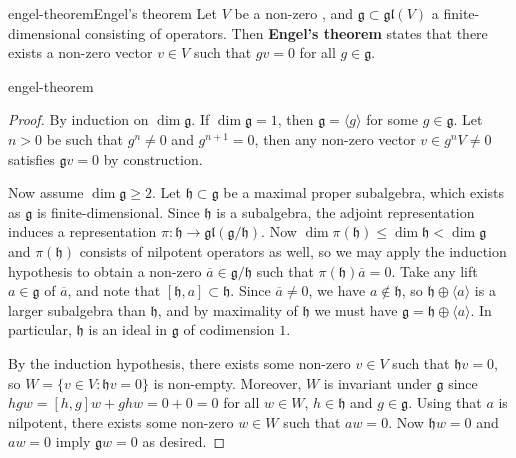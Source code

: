 \begin{topic}{engel-theorem}{Engel's theorem}
    Let $V$ be a non-zero , and $\mathfrak{g} \subset \mathfrak{gl}(V)$ a finite-dimensional  consisting of  operators. Then \textbf{Engel's theorem} states that there exists a non-zero vector $v \in V$ such that $gv = 0$ for all $g \in \mathfrak{g}$.
\end{topic}

\begin{example}{engel-theorem}
    \begin{proof}
        By induction on $\dim \mathfrak{g}$. If $\dim \mathfrak{g} = 1$, then $\mathfrak{g} = \langle g \rangle$ for some $g \in \mathfrak{g}$. Let $n > 0$ be such that $g^n \ne 0$ and $g^{n + 1} = 0$, then any non-zero vector $v \in g^n V \ne 0$ satisfies $\mathfrak{g} v = 0$ by construction.
    
        Now assume $\dim \mathfrak{g} \ge 2$. Let $\mathfrak{h} \subset \mathfrak{g}$ be a maximal proper subalgebra, which exists as $\mathfrak{g}$ is finite-dimensional. Since $\mathfrak{h}$ is a subalgebra, the adjoint representation induces a representation $\pi \colon \mathfrak{h} \to \mathfrak{gl}(\mathfrak{g}/\mathfrak{h})$. Now $\dim \pi(\mathfrak{h}) \le \dim \mathfrak{h} < \dim \mathfrak{g}$ and $\pi(\mathfrak{h})$ consists of nilpotent operators as well, so we may apply the induction hypothesis to obtain a non-zero $\overline{a} \in \mathfrak{g}/\mathfrak{h}$ such that $\pi(\mathfrak{h}) \overline{a} = 0$. Take any lift $a \in \mathfrak{g}$ of $\overline{a}$, and note that $[\mathfrak{h}, a] \subset \mathfrak{h}$. Since $\overline{a} \ne 0$, we have $a \not\in \mathfrak{h}$, so $\mathfrak{h} \oplus \langle a \rangle$ is a larger subalgebra than $\mathfrak{h}$, and by maximality of $\mathfrak{h}$ we must have $\mathfrak{g} = \mathfrak{h} \oplus \langle a \rangle$. In particular, $\mathfrak{h}$ is an ideal in $\mathfrak{g}$ of codimension $1$.
        
        By the induction hypothesis, there exists some non-zero $v \in V$ such that $\mathfrak{h} v = 0$, so $W = \{ v \in V : \mathfrak{h} v = 0 \}$ is non-empty. Moreover, $W$ is invariant under $\mathfrak{g}$ since $hgw = [h, g]w + ghw = 0 + 0 = 0$ for all $w \in W$, $h \in \mathfrak{h}$ and $g \in \mathfrak{g}$. Using that $a$ is nilpotent, there exists some non-zero $w \in W$ such that $aw = 0$. Now $\mathfrak{h} w = 0$ and $aw = 0$ imply $\mathfrak{g} w = 0$ as desired.
    \end{proof}
\end{example}

